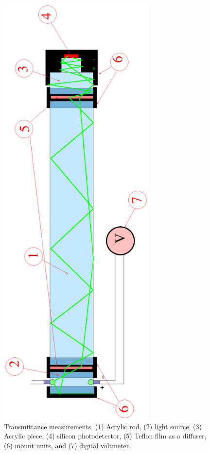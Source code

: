 \begin{figure}[htbp]
\begin{center}
\includegraphics[clip=true,angle=-90,width=0.7\textwidth]{LGTEMEASUREMENT.ps}
\end{center}
\caption{\small{Transmittance measurements. (1) Acrylic rod, (2) light source,
(3) Acrylic piece, (4) silicon photodetector, (5) Teflon film as a diffuser, 
(6) mount units, and (7) digital voltmeter.}}
\label{pratra}
\end{figure}

